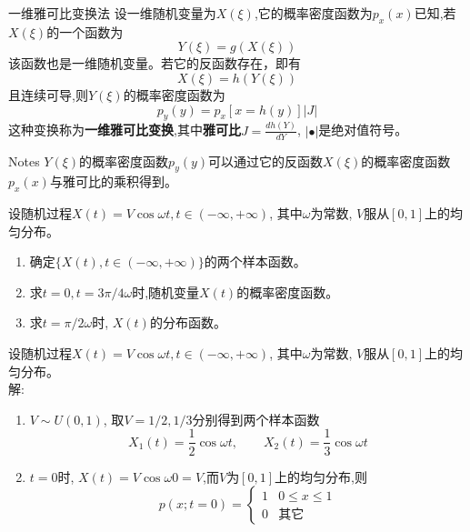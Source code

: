 \begin{frame}{一维雅可比变换法}
设一维随机变量为$X(\xi)$,它的概率密度函数为$p_x(x)$已知,若$X(\xi)$的一个函数为
\[Y(\xi)=g(X(\xi)) \]
该函数也是一维随机变量。若它的反函数存在，即有
\[X(\xi)=h(Y(\xi)) \]
且连续可导,则$Y(\xi)$的概率密度函数为
\[p_y(y)=p_x[x=h(y)]|J| \]
这种变换称为\textbf{一维雅可比变换},其中\textbf{雅可比}$J=\frac{dh(Y)}{dY}$, $|\bullet|$是绝对值符号。
\begin{block}{Notes}
	$Y(\xi)$的概率密度函数$p_y(y)$可以通过它的反函数$X(\xi)$的概率密度函数$p_x(x)$与雅可比的乘积得到。
\end{block}
\end{frame}

\begin{frame}
\begin{example}
	设随机过程$X(t)=V\cos\omega t,t\in(-\infty,+\infty)$, 其中$\omega$为常数, $V$服从$[0,1]$上的均匀分布。
	\begin{enumerate}
		\item 确定$\{X(t),t\in(-\infty,+\infty)\}$的两个样本函数。
		\item 求$t=0,t=3\pi/4\omega$时,随机变量$X(t)$的概率密度函数。
		\item 求$t=\pi/2\omega$时, $X(t)$的分布函数。
	\end{enumerate}
\end{example}
\end{frame}

\begin{frame}
设随机过程$X(t)=V\cos\omega t,t\in(-\infty,+\infty)$, 其中$\omega$为常数, $V$服从$[0,1]$上的均匀分布。\\
解: 
\begin{enumerate}
	\item $V\sim U(0,1)$, 取$V=1/2,1/3$分别得到两个样本函数
	\[X_1(t)=\frac{1}{2}\cos\omega t,\qquad X_2(t)=\frac{1}{3}\cos\omega t\]
	\item $t=0$时, $X(t)=V\cos\omega 0=V$,而$V$为$[0,1]$上的均匀分布,则
	$$
	p(x;t=0)=\begin{cases}
	1 & 0\le x\le 1\\
	0 &\text{其它}	
    \end{cases}
    $$
\end{enumerate}
\end{frame}

